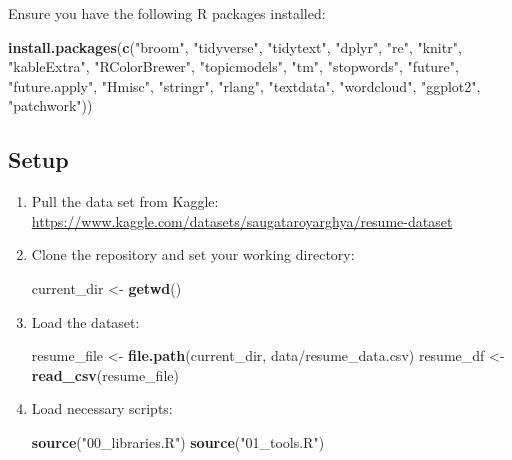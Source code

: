 \documentclass[
]{article}
\newenvironment{Shaded}{\begin{snugshade}}{\end{snugshade}}
\newcommand{\FunctionTok}[1]{\textcolor[rgb]{0.13,0.29,0.53}{\textbf{#1}}}
\newcommand{\NormalTok}[1]{#1}
\newcommand{\OtherTok}[1]{\textcolor[rgb]{0.56,0.35,0.01}{#1}}
\newcommand{\StringTok}[1]{\textcolor[rgb]{0.31,0.60,0.02}{#1}}
\begin{document}
Ensure you have the following R packages installed:

\begin{Shaded}
\begin{Highlighting}[]
\FunctionTok{install.packages}\NormalTok{(}\FunctionTok{c}\NormalTok{(}\StringTok{"broom"}\NormalTok{, }\StringTok{"tidyverse"}\NormalTok{, }\StringTok{"tidytext"}\NormalTok{, }\StringTok{"dplyr"}\NormalTok{, }\StringTok{"re"}\NormalTok{, }\StringTok{"knitr"}\NormalTok{,}
                   \StringTok{"kableExtra"}\NormalTok{, }\StringTok{"RColorBrewer"}\NormalTok{, }\StringTok{"topicmodels"}\NormalTok{, }\StringTok{"tm"}\NormalTok{, }\StringTok{"stopwords"}\NormalTok{,}
                   \StringTok{"future"}\NormalTok{, }\StringTok{"future.apply"}\NormalTok{, }\StringTok{"Hmisc"}\NormalTok{, }\StringTok{"stringr"}\NormalTok{, }\StringTok{"rlang"}\NormalTok{, }\StringTok{"textdata"}\NormalTok{,}
                   \StringTok{"wordcloud"}\NormalTok{, }\StringTok{"ggplot2"}\NormalTok{, }\StringTok{"patchwork"}\NormalTok{))}
\end{Highlighting}
\end{Shaded}

\subsection{Setup}\label{setup}

\begin{enumerate}
\def\labelenumi{\arabic{enumi}.}
\item
  Pull the data set from Kaggle:
  \url{https://www.kaggle.com/datasets/saugataroyarghya/resume-dataset}
\item
  Clone the repository and set your working directory:

\begin{Shaded}
\begin{Highlighting}[]
\NormalTok{current\_dir }\OtherTok{\textless{}{-}} \FunctionTok{getwd}\NormalTok{()}
\end{Highlighting}
\end{Shaded}
\item
  Load the dataset:

\begin{Shaded}
\begin{Highlighting}[]
\NormalTok{resume\_file }\OtherTok{\textless{}{-}} \FunctionTok{file.path}\NormalTok{(current\_dir, }\StringTok{\textquotesingle{}data/resume\_data.csv\textquotesingle{}}\NormalTok{)}
\NormalTok{resume\_df }\OtherTok{\textless{}{-}} \FunctionTok{read\_csv}\NormalTok{(resume\_file)}
\end{Highlighting}
\end{Shaded}
\item
  Load necessary scripts:

\begin{Shaded}
\begin{Highlighting}[]
\FunctionTok{source}\NormalTok{(}\StringTok{"00\_libraries.R"}\NormalTok{)}
\FunctionTok{source}\NormalTok{(}\StringTok{"01\_tools.R"}\NormalTok{)}
\end{Highlighting}
\end{Shaded}
\end{enumerate}
\end{document}

